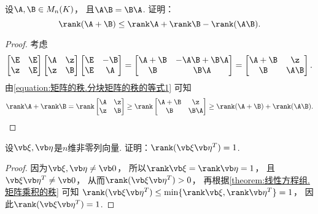 \begin{example}\label{example:矩阵乘积的秩.可交换矩阵之和的秩}
设\(\A,\B\in M_n(K)\)，
且\(\A \B=\B\A\).
证明：\[
	\rank(\A+\B)\leq\rank\A+\rank\B-\rank(\A \B).
\]
\begin{proof}
考虑\[
	\begin{bmatrix}
		\E & \E \\
		\z & \E
	\end{bmatrix}
	\begin{bmatrix}
		\A & \z \\
		\z & \B
	\end{bmatrix}
	\begin{bmatrix}
		\E & -\B \\
		\E & \A
	\end{bmatrix}
	= \begin{bmatrix}
		\A+\B & -\A \B+\B\A \\
		\B & \B\A
	\end{bmatrix}
	= \begin{bmatrix}
		\A+\B & \z \\
		\B & \A \B
	\end{bmatrix}.
\]
由\cref{equation:矩阵的秩.分块矩阵的秩的等式1} 可知\[
	\rank\A+\rank\B
	= \rank\begin{bmatrix}
		\A & \z \\
		\z & \B
	\end{bmatrix}
	\geq \rank\begin{bmatrix}
		\A+\B & \z \\
		\B & \B\A
	\end{bmatrix}
	\geq \rank(\A+\B) + \rank(\A \B).
	\qedhere
\]
\end{proof}
\end{example}

\begin{example}\label{example:矩阵乘积的秩.两个向量的乘积的秩}
设\(\a,\b\)是\(n\)维非零列向量.
证明：\(\rank(\a\b^T)=1\).
\begin{proof}
因为\(\a,\b\neq\vb0\)，
所以\(\rank\a=\rank\b=1\)，
且\(\a\b^T\neq\vb0\)，
从而\(\rank(\a\b^T)>0\)，
再根据\cref{theorem:线性方程组.矩阵乘积的秩} 可知
\(\rank(\a\b^T)
\leq \min\{\rank\a,\rank\b^T\}
= 1\)，
因此\(\rank(\a\b^T)=1\).
\end{proof}
\end{example}

